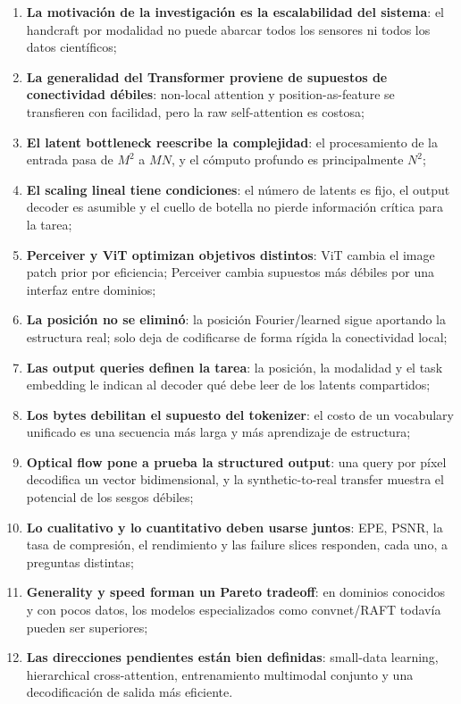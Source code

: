 \begin{enumerate}
  \item \textbf{La motivación de la investigación es la escalabilidad del sistema}: el handcraft por modalidad no puede abarcar todos los sensores ni todos los datos científicos;
  \item \textbf{La generalidad del Transformer proviene de supuestos de conectividad débiles}: non-local attention y position-as-feature se transfieren con facilidad, pero la raw self-attention es costosa;
  \item \textbf{El latent bottleneck reescribe la complejidad}: el procesamiento de la entrada pasa de $M^2$ a $MN$, y el cómputo profundo es principalmente $N^2$;
  \item \textbf{El scaling lineal tiene condiciones}: el número de latents es fijo, el output decoder es asumible y el cuello de botella no pierde información crítica para la tarea;
  \item \textbf{Perceiver y ViT optimizan objetivos distintos}: ViT cambia el image patch prior por eficiencia; Perceiver cambia supuestos más débiles por una interfaz entre dominios;
  \item \textbf{La posición no se eliminó}: la posición Fourier/learned sigue aportando la estructura real; solo deja de codificarse de forma rígida la conectividad local;
  \item \textbf{Las output queries definen la tarea}: la posición, la modalidad y el task embedding le indican al decoder qué debe leer de los latents compartidos;
  \item \textbf{Los bytes debilitan el supuesto del tokenizer}: el costo de un vocabulary unificado es una secuencia más larga y más aprendizaje de estructura;
  \item \textbf{Optical flow pone a prueba la structured output}: una query por píxel decodifica un vector bidimensional, y la synthetic-to-real transfer muestra el potencial de los sesgos débiles;
  \item \textbf{Lo cualitativo y lo cuantitativo deben usarse juntos}: EPE, PSNR, la tasa de compresión, el rendimiento y las failure slices responden, cada uno, a preguntas distintas;
  \item \textbf{Generality y speed forman un Pareto tradeoff}: en dominios conocidos y con pocos datos, los modelos especializados como convnet/RAFT todavía pueden ser superiores;
  \item \textbf{Las direcciones pendientes están bien definidas}: small-data learning, hierarchical cross-attention, entrenamiento multimodal conjunto y una decodificación de salida más eficiente.
\end{enumerate}

